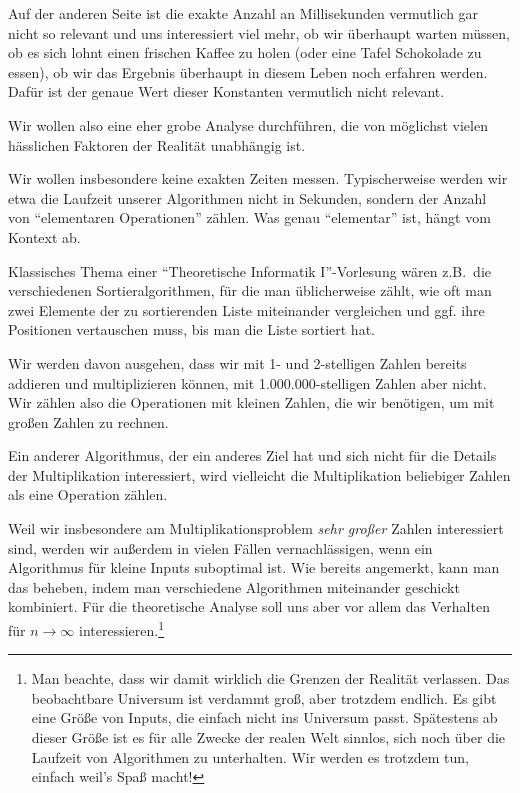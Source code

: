 \begin{remark}
    Auf der anderen Seite ist die exakte Anzahl an Millisekunden vermutlich gar nicht so relevant und uns interessiert viel mehr, ob wir überhaupt warten müssen, ob es sich lohnt einen frischen Kaffee zu holen (oder eine Tafel Schokolade zu essen), ob wir das Ergebnis überhaupt in diesem Leben noch erfahren werden. Dafür ist der genaue Wert dieser Konstanten vermutlich nicht relevant.

    \medskip
    Wir wollen also eine eher grobe Analyse durchführen, die von möglichst vielen hässlichen Faktoren der Realität unabhängig ist.

    Wir wollen insbesondere keine exakten Zeiten messen. Typischerweise werden wir etwa die Laufzeit unserer Algorithmen nicht in Sekunden, sondern der Anzahl von \enquote{elementaren Operationen} zählen. Was genau \enquote{elementar} ist, hängt vom Kontext ab.

    \smallskip
    Klassisches Thema einer \enquote{Theoretische Informatik I}-Vorlesung wären z.B.\ die verschiedenen Sortieralgorithmen, für die man üblicherweise zählt, wie oft man zwei Elemente der zu sortierenden Liste miteinander vergleichen und ggf. ihre Positionen vertauschen muss, bis man die Liste sortiert hat.

    \smallskip
    Wir werden davon ausgehen, dass wir mit 1- und 2-stelligen Zahlen bereits addieren und multiplizieren können, mit 1.000.000-stelligen Zahlen aber nicht. Wir zählen also die Operationen mit kleinen Zahlen, die wir benötigen, um mit großen Zahlen zu rechnen.

    \smallskip
    Ein anderer Algorithmus, der ein anderes Ziel hat und sich nicht für die Details der Multiplikation interessiert, wird vielleicht die Multiplikation beliebiger Zahlen als eine Operation zählen.
\end{remark}

\begin{remark}
    Weil wir insbesondere am Multiplikationsproblem \emph{sehr großer} Zahlen interessiert sind, werden wir außerdem in vielen Fällen vernachlässigen, wenn ein Algorithmus für kleine Inputs suboptimal ist. Wie bereits angemerkt, kann man das beheben, indem man verschiedene Algorithmen miteinander geschickt kombiniert. Für die theoretische Analyse soll uns aber vor allem das Verhalten für $n\to\infty$ interessieren.\footnote{Man beachte, dass wir damit wirklich die Grenzen der Realität verlassen. Das beobachtbare Universum ist verdammt groß, aber trotzdem endlich. Es gibt eine Größe von Inputs, die einfach nicht ins Universum passt. Spätestens ab dieser Größe ist es für alle Zwecke der realen Welt sinnlos, sich noch über die Laufzeit von Algorithmen zu unterhalten. Wir werden es trotzdem tun, einfach weil's Spaß macht!}
\end{remark}

